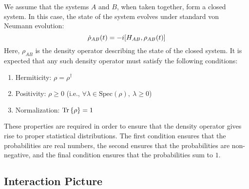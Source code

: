 \documentclass{article}
\newcommand{\Tra}[1]{\Tr\left\{#1\right\}}
\begin{document}
We assume that the systems $A$ and $B$, when taken together, form a closed system. In this case, the state of the system evolves under standard von Neumann evolution:
\begin{equation}\label{vnAB}
\dot{\rho}_{AB}(t) = -i\comm{H_{AB}}{\rho_{AB}(t)}
\end{equation}
Here, $\rho_{AB}$ is the density operator describing the state of the closed system. It is expected that any such density operator must satisfy the following conditions:
\begin{enumerate}
	\item Hermiticity: $\rho = \rho^{\dag}$
	\item Positivity: $\rho \geq 0$ (i.e., $\forall \lambda\in \text{Spec}(\rho),\ \lambda \geq 0$)
	\item Normalization: $\Tra{\rho} = 1$
\end{enumerate}
These properties are required in order to ensure that the density operator gives rise to proper statistical distributions. The first condition ensures that the probabilities are real numbers, the second ensures that the probabilities are non-negative, and the final condition ensures that the probabilities sum to $1$.

\subsection{Interaction Picture}
\end{document}
